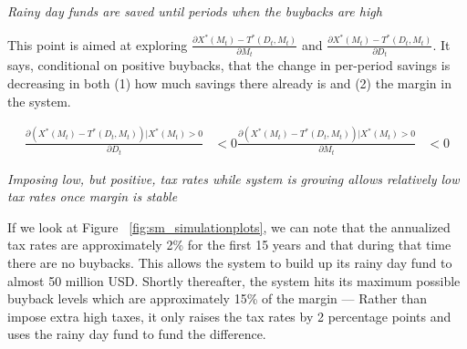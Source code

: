 \vspace{0.25cm}

\textit{Rainy day funds are saved until periods when the buybacks are high}

This point is aimed at exploring $\frac{\partial X^*(M_t) - T^*(D_t, M_t)}{\partial M_t}$ and
$\frac{\partial X^*(M_t) - T^*(D_t, M_t)}{\partial D_t}$. It says, conditional on positive buybacks,
that the change in per-period savings is decreasing in both (1) how much savings there already is
and (2) the margin in the system.

\begin{align*}
  \frac{\partial (X^*(M_t) - T^*(D_t, M_t)) | X^*(M_t) > 0}{\partial D_t} &< 0
  \frac{\partial (X^*(M_t) - T^*(D_t, M_t)) | X^*(M_t) > 0}{\partial M_t} &< 0
\end{align*}

\vspace{0.25cm}

\textit{Imposing low, but positive, tax rates while system is growing allows relatively low tax rates once margin is stable}

If we look at Figure ~\ref{fig:sm_simulationplots}, we can note that the annualized tax rates are
approximately 2\% for the first 15 years and that during that time there are no buybacks. This
allows the system to build up its rainy day fund to almost 50 million USD. Shortly thereafter, the
system hits its maximum possible buyback levels which are approximately 15\% of the margin ---
Rather than impose extra high taxes, it only raises the tax rates by 2 percentage points and uses
the rainy day fund to fund the difference.
